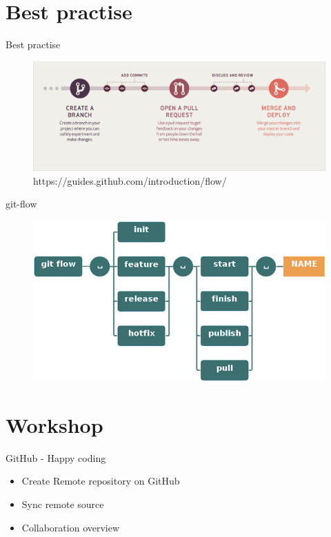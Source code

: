 \documentclass{beamer}
\begin{document}
\section{Best practise}
\begin{frame}{Best practise}
    \begin{figure}
        \center
        \includegraphics[width=.9\textwidth]{git-workflow}
        \caption{https://guides.github.com/introduction/flow/}
        \label{fig:git-workflow}
    \end{figure}
\end{frame}

\begin{frame}{git-flow}
    \begin{figure}
        \center
        \includegraphics[width=.9\textwidth]{git-flow-commands}
        \label{fig:git-flow-commands}
    \end{figure}
\end{frame}

\section{Workshop}
\begin{frame}{GitHub - Happy coding}
    \begin{itemize}
        \item Create Remote repository on GitHub
        \item Sync remote source
        \item Collaboration overview
    \end{itemize}
\end{frame}
\end{document}
